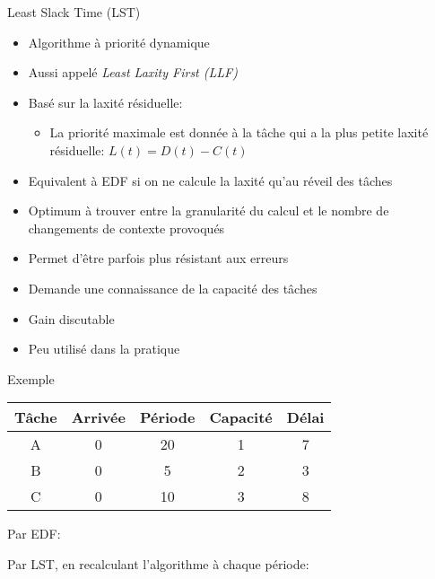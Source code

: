 \begin{frame}{Least Slack Time (LST)} 
  \begin{itemize}
  \item Algorithme à priorité dynamique
  \item Aussi appelé \emph{Least Laxity First (LLF)}
  \item Basé sur la laxité résiduelle: 
    \begin{itemize}
    \item La  priorité maximale est  donnée à la  tâche qui a  la plus
      petite laxité résiduelle: $L(t) = D(t) - C(t)$
    \end{itemize}
  \item Equivalent à  EDF si on ne calcule la  laxité qu'au réveil des
    tâches
  \item Optimum à trouver entre  la granularité du calcul et le nombre
    de changements de  contexte provoqués 
  \item Permet d'être parfois plus résistant aux erreurs
  \item Demande une connaissance de la capacité des tâches
  \item Gain discutable
  \item Peu utilisé dans la pratique
  \end{itemize}
\end{frame}

\begin{frame}{Exemple}
  \begin{center}
    \begin{tabular}{ccccc}
      \hline
      Tâche & Arrivée & Période & Capacité & Délai \\
      \hline
      A & 0 & 20 & 1 & 7\\
      B & 0 &  5 & 2 & 3\\
      C & 0 & 10 & 3 & 8\\
      \hline
    \end{tabular}
  \end{center}
  \begin{overprint}

    Par EDF:
    \begin{center}  
      
    \end{center}

    Par LST, en recalculant l'algorithme à chaque période:
    \begin{center}  
      
    \end{center}
  \end{overprint}
\end{frame} 

